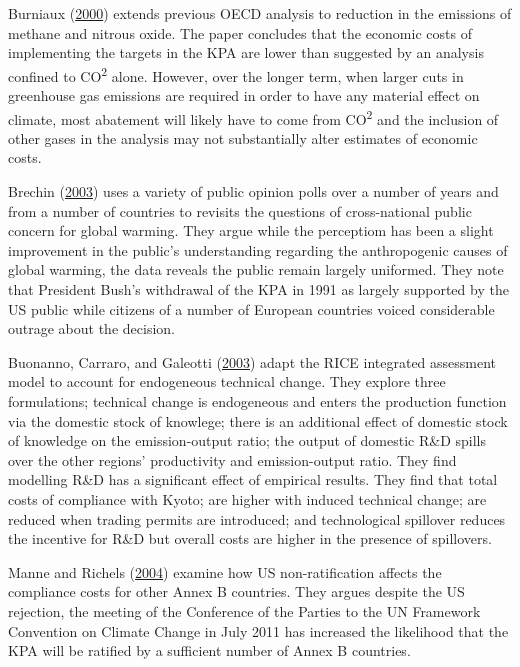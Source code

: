 \documentclass[12pt,]{article}
\begin{document}
Burniaux (\protect\hyperlink{ref-Burniaux2000}{2000}) extends previous OECD analysis to reduction in the emissions of methane and nitrous oxide. The paper concludes that the economic costs of implementing the targets in the KPA are lower than suggested by an analysis confined to CO\textsuperscript{2} alone. However, over the longer term, when larger cuts in greenhouse gas emissions are required in order to have any material effect on climate, most abatement will likely have to come from CO\textsuperscript{2} and the inclusion of other gases in the analysis may not substantially alter estimates of economic costs.

Brechin (\protect\hyperlink{ref-Brechin2003}{2003}) uses a variety of public opinion polls over a number of years and from a number of countries to revisits the questions of cross-national public concern for global warming. They argue while the perceptiom has been a slight improvement in the public's understanding regarding the anthropogenic causes of global warming, the data reveals the public remain largely uniformed. They note that President Bush's withdrawal of the KPA in 1991 as largely supported by the US public while citizens of a number of European countries voiced considerable outrage about the decision.

Buonanno, Carraro, and Galeotti (\protect\hyperlink{ref-Buonanno2003}{2003}) adapt the RICE integrated assessment model to account for endogeneous technical change. They explore three formulations; technical change is endogeneous and enters the production function via the domestic stock of knowlege; there is an additional effect of domestic stock of knowledge on the emission-output ratio; the output of domestic R\&D spills over the other regions' productivity and emission-output ratio. They find modelling R\&D has a significant effect of empirical results. They find that total costs of compliance with Kyoto; are higher with induced technical change; are reduced when trading permits are introduced; and technological spillover reduces the incentive for R\&D but overall costs are higher in the presence of spillovers.

Manne and Richels (\protect\hyperlink{ref-Manne2004}{2004}) examine how US non-ratification affects the compliance costs for other Annex B countries. They argues despite the US rejection, the meeting of the Conference of the Parties to the UN Framework Convention on Climate Change in July 2011 has increased the likelihood that the KPA will be ratified by a sufficient number of Annex B countries.
\end{document}
